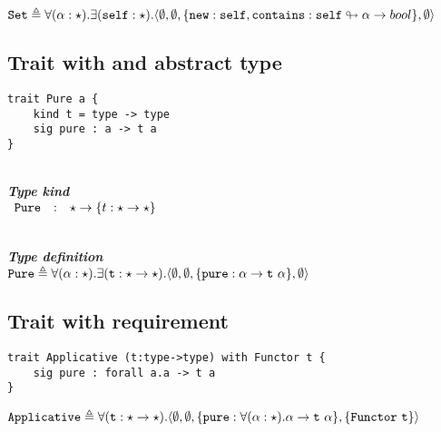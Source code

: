 \documentclass{article}[11pt]
\newcommand{\subsubsubsection}[1]
{
    ~\\
    {\bf {\em #1}} \\
}
\newcommand{\term}[1]{\verb~#1~}
\begin{document}
    \noindent
    \begin{math}
        \term{Set} \triangleq \forall(\alpha:\star).\exists(\term{self}:\star).\langle
        \emptyset,
        \emptyset,
        \{ \term{new} : \term{self}, \term{contains} : \term{self} \looparrowright \alpha \rightarrow bool \},
        \emptyset
        \rangle
    \end{math}

    \subsection{Trait with and abstract type}\label{subsec:trait-with-and-abstract-type}

    \begin{verbatim}
trait Pure a {
    kind t = type -> type
    sig pure : a -> t a
}
    \end{verbatim}

    \subsubsubsection{Type kind}

    \noindent
    \begin{math}
        \begin{array}{rclp{5cm}}
            \term{Pure} & : & \star \rightarrow \{ t : \star \rightarrow \star \}
        \end{array}
    \end{math}

    \subsubsubsection{Type definition}

    \noindent
    \begin{math}
        \term{Pure} \triangleq \forall(\alpha:\star).\exists(\term{t}:\star \rightarrow \star).\langle
        \emptyset,
        \emptyset,
        \{ \term{pure} : \alpha \rightarrow \term{t}~\alpha \},
        \emptyset
        \rangle
    \end{math}

    \subsection{Trait with requirement}\label{subsec:trait-with-requirement}

    \begin{verbatim}
trait Applicative (t:type->type) with Functor t {
    sig pure : forall a.a -> t a
}
    \end{verbatim}

    \noindent
    \begin{math}
        \term{Applicative} \triangleq \forall(\term{t}:\star \rightarrow \star).
        \langle
        \emptyset,
        \emptyset,
        \{ \term{pure} : \forall(\alpha:\star).\alpha \rightarrow \term{t}~\alpha \},
        \{ \term{Functor}~\term{t} \}
        \rangle
    \end{math}
\end{document}
